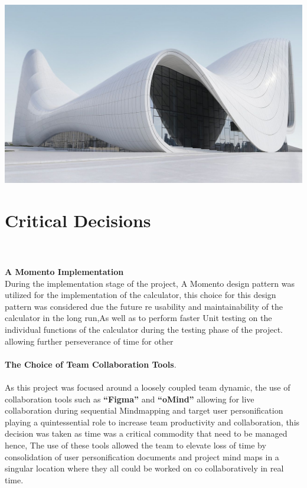 \documentclass[30pt,a0,portrait]{a0poster}
\begin{document}
\begin{multicols}{2}
\begin{center}\vspace{0.5cm}
\includegraphics[width=1\linewidth]{figures/arc.jpg}
\end{center}\vspace{1cm}


\section*{Critical Decisions}
\\\\
\noindent \textbf{A Momento Implementation}\hfi \\ 

\noindent During the implementation stage of the project, A Momento design pattern was utilized for the implementation of the calculator, this choice for this design pattern was considered due the future re usability and maintainability of the calculator in the long run,As well as to perform faster Unit testing on the individual functions of the calculator during the testing phase of the project. allowing further perseverance of time for other 
\\
\\
\textbf{The Choice of Team Collaboration Tools}.\hfill \\
\\
\noindent As this project was focused around a loosely coupled team dynamic, the use of collaboration tools such as \textbf{“Figma”} and \textbf{“oMind”} allowing for live collaboration during sequential Mindmapping and target user personification playing a quintessential role to increase team productivity and collaboration, this decision was taken as time was a critical commodity that need to be managed hence, The use of these tools allowed the team to elevate loss of time by consolidation of  user personification documents and project mind maps in a singular location where they all could be worked on co collaboratively in real time. 




\end{multicols}
\end{document}
